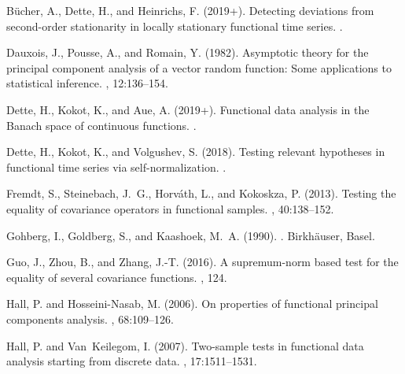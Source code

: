 \documentclass[11pt]{article}
\numberwithin{equation}{section}
\numberwithin{theorem}{section}
\numberwithin{lemma}{section}
\numberwithin{proposition}{section}
\numberwithin{cor}{section}
\numberwithin{definition}{section}
\numberwithin{cons}{section}
\numberwithin{rem}{section}
\numberwithin{exa}{section}
\numberwithin{table}{section}
\numberwithin{figure}{section}
\numberwithin{algo}{section}
\begin{document}
{{\begin{thebibliography}{}
B\"ucher, A., Dette, H., and Heinrichs, F. (2019+).
\newblock Detecting deviations from second-order stationarity in locally
  stationary functional time series.
.

Dauxois, J., Pousse, A., and Romain, Y. (1982).
\newblock Asymptotic theory for the principal component analysis of a vector
  random function: Some applications to statistical inference.
, 12:136--154.

Dette, H., Kokot, K., and Aue, A. (2019+).
\newblock Functional data analysis in the {B}anach space of continuous
  functions.
.

Dette, H., Kokot, K., and Volgushev, S. (2018).
\newblock Testing relevant hypotheses in functional time series via
  self-normalization.
.

Fremdt, S., Steinebach, J.~G., Horv\'ath, L., and Kokoskza, P. (2013).
\newblock Testing the equality of covariance operators in functional samples.
, 40:138--152.

Gohberg, I., Goldberg, S., and Kaashoek, M.~A. (1990).
.
\newblock Birkh{\"{a}}user, Basel.

Guo, J., Zhou, B., and Zhang, J.-T. (2016).
\newblock A supremum-norm based test for the equality of several covariance
  functions.
, 124.

Hall, P. and Hosseini-Nasab, M. (2006).
\newblock On properties of functional principal components analysis.
,
  68:109--126.

Hall, P. and Van~Keilegom, I. (2007).
\newblock Two-sample tests in functional data analysis starting from discrete
  data.
, 17:1511--1531.


\end{thebibliography}}}
\end{document}
